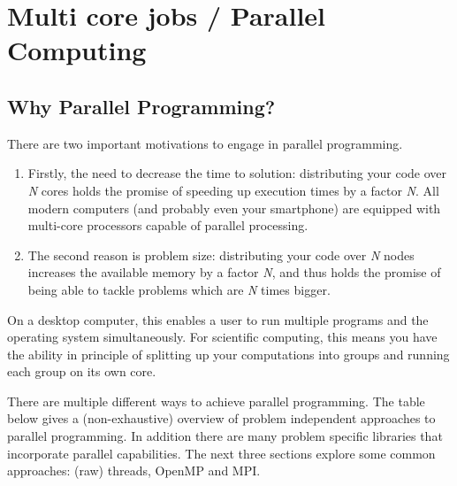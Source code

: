 \chapter{Multi core jobs / Parallel Computing}

\section{Why Parallel Programming?}

There are two important motivations to engage in parallel programming.

\begin{enumerate}

\item  Firstly, the need to decrease the time to solution: distributing your
  code over \emph{N} cores holds the promise of speeding up execution times
  by a factor \emph{N}. All modern computers (and probably even your
  smartphone) are equipped with multi-core processors capable of parallel
  processing.
\item  The second reason is problem size: distributing your code over
  \emph{N} nodes increases the available memory by a factor \emph{N}, and
  thus holds the promise of being able to tackle problems which are \emph{N}
  times bigger.
\end{enumerate}

On a desktop computer, this enables a user to run multiple programs and the
operating system simultaneously. For scientific computing, this means you have
the ability in principle of splitting up your computations into groups and
running each group on its own core.

There are multiple different ways to achieve parallel programming. The table
below gives a (non-exhaustive) overview of problem independent approaches to
parallel programming. In addition there are many problem specific libraries
that incorporate parallel capabilities. The next three sections explore some
common approaches: (raw) threads, OpenMP and MPI.

